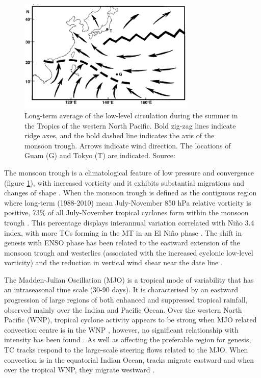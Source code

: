 \begin{figure}[h]
	\centering
	\noindent\includegraphics[width=20pc,angle=0]{MT_Lander.png}
	\caption{Long-term average of the low-level circulation during the summer in the Tropics of the western North Pacific. Bold zig-zag lines indicate ridge axes, and the bold dashed line indicates the axis of the monsoon trough. Arrows indicate wind direction. The locations of Guam (G) and Tokyo (T) are indicated. Source: \cite{lander1996specific}}\label{fig:MT}
\end{figure}

The monsoon trough is a climatological feature of low pressure and convergence (figure \ref{fig:MT}), with increased vorticity and it exhibits substantial migrations and changes of shape \citep{lander1996specific}. When the monsoon trough is defined as the contiguous region where long-term (1988-2010) mean July-November 850 hPa relative vorticity is positive, 73\% of all July-November tropical cyclones form within the monsoon trough \citep{molinari2013percentage}. This percentage displays interannual variation correlated with Ni\~{n}o 3.4 index, with more TCs forming in the MT in an El Ni\~{n}o phase \citep{molinari2013percentage}. The shift in genesis with ENSO phase has been related to the eastward extension of the monsoon trough and westerlies (associated with the increased cyclonic low-level vorticity) and the reduction in vertical wind shear near the date line \citep{lander1994exploratory, lander1996specific, wang2002strong}.

The Madden-Julian Oscillation (MJO) is a tropical mode of variability that has an intraseasonal time scale (30-90 days). It is characterised by an eastward progression of large regions of both enhanced and suppressed tropical rainfall, observed mainly over the Indian and Pacific Ocean. Over the western North Pacific (WNP), tropical cyclone activity appears to be strong when MJO related convection centre is in the WNP \citep{kim2008systematic}, however, no significant relationship with intensity has been found \citep{liebmann1994relationship}. As well as affecting the preferable region for genesis, TC tracks respond to the large-scale steering flows related to the MJO. When convection is in the equatorial Indian Ocean, tracks migrate eastward and when over the tropical WNP, they migrate westward \citep{kim2008systematic}.


